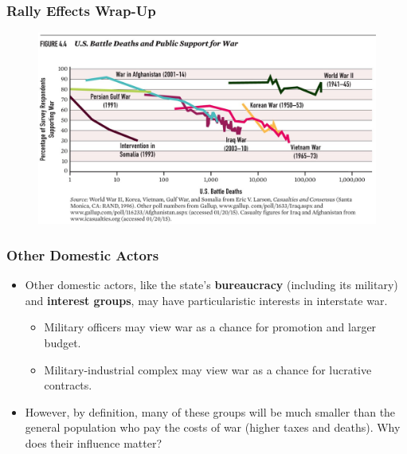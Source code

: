 \documentclass[handout]{beamer}
\begin{document}
\begin{frame} 
	\frametitle{\LARGE{Rally Effects Wrap-Up}}
	\begin{figure}[ht!]
		\centering
		\includegraphics[width=\textwidth,height=0.9\textheight,keepaspectratio]{USappbd.jpg}
	\end{figure}
\end{frame}

\begin{frame} 
	\frametitle{\LARGE{Other Domestic Actors}}
	\begin{itemize}
		\item Other domestic actors, like the state's \textbf{bureaucracy} (including its military) and \textbf{interest groups}, may have particularistic interests in interstate war. \pause
		\begin{itemize}
			\item Military officers may view war as a chance for promotion and larger budget. \pause
			\item Military-industrial complex may view war as a chance for lucrative contracts. \pause
		\end{itemize}
	\item However, by definition, many of these groups will be much smaller than the general population who pay the costs of war (higher taxes and deaths). Why does their influence matter? 
	\end{itemize}
\end{frame}
\end{document}
